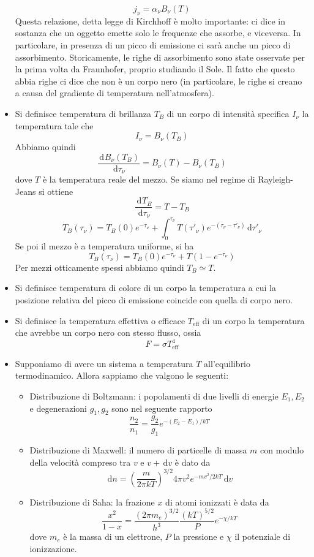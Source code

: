 \documentclass[a4paper,11pt]{article}
\renewcommand{\d}{\mathrm{d}} %
\newcommand{\der}[3][]{\frac{\d ^{#1}#2}{\d {#3}^{#1}}} %
\renewcommand{\d}{\,\mathrm{d}}
\theoremstyle{theorem}
\theoremstyle{definition}
\begin{document}
\begin{itemize}
	\[j_\nu=\alpha_\nu B_\nu(T)\]
	Questa relazione, detta legge di Kirchhoff è molto importante: ci dice in sostanza che un oggetto emette solo le frequenze che assorbe, e viceversa. In particolare, in presenza di un picco di emissione ci sarà anche un picco di assorbimento. Storicamente, le righe di assorbimento sono state osservate per la prima volta da Fraunhofer, proprio studiando il Sole. Il fatto che questo abbia righe ci dice che non è un corpo nero (in particolare, le righe si creano a causa del gradiente di temperatura nell'atmosfera).
	\item Si definisce temperatura di brillanza $T_B$ di un corpo di intensità specifica $I_\nu$ la temperatura tale che
	\[I_\nu=B_\nu(T_B)\]
	Abbiamo quindi
	\[\der{B_\nu(T_B)}{\tau_\nu}=B_\nu(T)-B_\nu(T_B)\]
	dove $T$ è la temperatura reale del mezzo. Se siamo nel regime di Rayleigh-Jeans si ottiene
	\[\der{T_B}{\tau_\nu}=T-T_B\]
	\[T_B(\tau_\nu)=T_B(0)e^{-\tau_\nu}+\int_{0}^{\tau_\nu}T(\tau'_\nu)e^{-(\tau_\nu-\tau'_\nu)}\d\tau'_\nu\]
	Se poi il mezzo è a temperatura uniforme, si ha
	\[T_B(\tau_\nu)=T_B(0)e^{-\tau_\nu}+T(1-e^{-\tau_\nu})\]
	Per mezzi otticamente spessi abbiamo quindi $T_B\simeq T$.
	\item Si definisce temperatura di colore di un corpo la temperatura a cui la posizione relativa del picco di emissione coincide con quella di corpo nero.
	\item Si definisce la temperatura effettiva o efficace $T_{\textrm{eff}}$ di un corpo la temperatura che avrebbe un corpo nero con stesso flusso, ossia
	\[F=\sigma T^4_\textrm{eff}\]
	\item Supponiamo di avere un sistema a temperatura $T$ all'equilibrio termodinamico. Allora sappiamo che valgono le seguenti:
	\begin{itemize}
		\item Distribuzione di Boltzmann: i popolamenti di due livelli di energie $E_1, E_2$ e degenerazioni $g_1,g_2$ sono nel seguente rapporto
		\[\frac{n_2}{n_1}=\frac{g_2}{g_1}e^{-(E_2-E_1)/kT}\]
		\item Distribuzione di Maxwell: il numero di particelle di massa $m$ con modulo della velocità compreso tra $v$ e $v+\d v$ è dato da
		\[\d n=\left(\frac{m}{2\pi kT}\right)^{3/2}4\pi v^2e^{-mv^2/2kT}\d v\]
		\item Distribuzione di Saha: la frazione $x$ di atomi ionizzati è data da
		\[\frac{x^2}{1-x}=\frac{(2\pi m_e)^{3/2}}{h^3}\frac{(kT)^{5/2}}{P}e^{-\chi/kT}\]
		dove $m_e$ è la massa di un elettrone, $P$ la pressione e $\chi$ il potenziale di ionizzazione.

\end{itemize}
\end{itemize}
\end{document}
